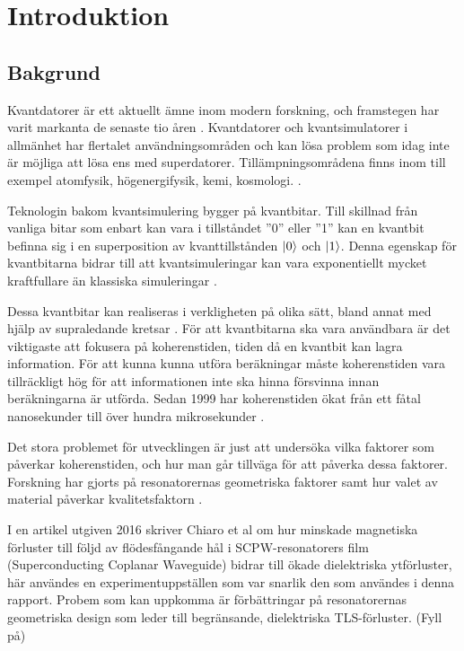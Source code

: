 \documentclass[main.tex]{subfiles}
\begin{document}
\chapter{Introduktion}
\section{Bakgrund}
Kvantdatorer är ett aktuellt ämne inom modern forskning, och framstegen har varit markanta de senaste tio åren \autocite{Bylander2017}. Kvantdatorer och kvantsimulatorer i allmänhet har flertalet användningsområden och kan lösa problem som idag inte är möjliga att lösa ens med superdatorer. Tillämpningsområdena finns inom till exempel atomfysik, högenergifysik, kemi, kosmologi. \cite{applications}.


Teknologin bakom kvantsimulering bygger på kvantbitar. Till skillnad från vanliga bitar som enbart kan vara i tillståndet ''0'' eller ''1'' kan en kvantbit befinna sig i en superposition av kvanttillstånden $\ket{0}$ och $\ket{1}$. Denna egenskap för kvantbitarna bidrar till att kvantsimuleringar kan vara exponentiellt mycket kraftfullare än klassiska simuleringar \cite{Eckstein2013}.

Dessa kvantbitar kan realiseras i verkligheten på olika sätt, bland annat med hjälp av supraledande kretsar \cite{Oliver2013}. För att kvantbitarna ska vara användbara är det viktigaste att fokusera på koherenstiden, tiden då en kvantbit kan lagra information. För att kunna kunna utföra beräkningar måste koherenstiden vara tillräckligt hög för att informationen inte ska hinna försvinna innan beräkningarna är utförda\cite{Eckstein2013}. Sedan 1999 har koherenstiden ökat från ett fåtal nanosekunder till över hundra mikrosekunder \cite{Wendin2016}.

Det stora problemet för utvecklingen är just att undersöka vilka faktorer som påverkar koherenstiden, och hur man går tillväga för att påverka dessa faktorer. Forskning har gjorts på resonatorernas geometriska faktorer \cite{Oliver2013}\cite{Chi} samt hur valet av material påverkar kvalitetsfaktorn \cite{Eckstein2013}.



I en artikel utgiven 2016 skriver Chiaro et al om hur minskade magnetiska förluster till följd av flödesfångande hål i SCPW-resonatorers film (Superconducting Coplanar Waveguide) bidrar till ökade dielektriska ytförluster, här användes en experimentuppställen som var snarlik den som användes i denna rapport. Probem som kan uppkomma är förbättringar på resonatorernas geometriska design som leder till begränsande, dielektriska TLS-förluster. (Fyll på)
\end{document}
